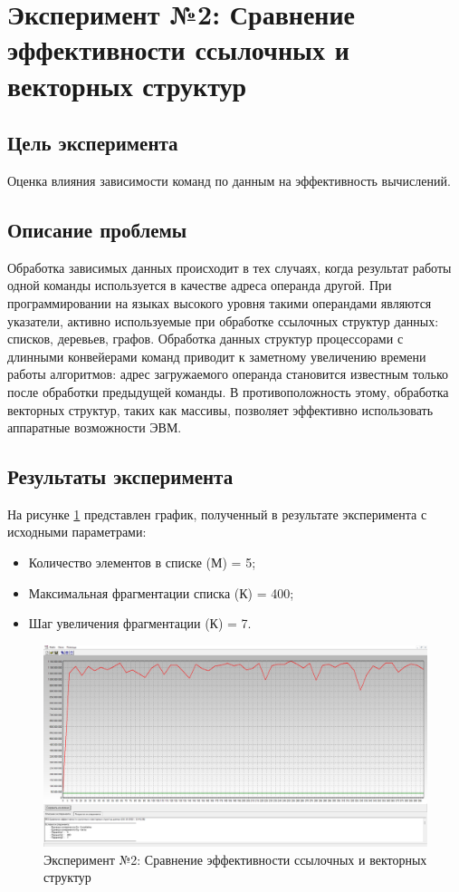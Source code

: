 \newpage


\section*{Эксперимент №2: Сравнение эффективности ссылочных и векторных структур}

\subsection*{Цель эксперимента}
Оценка влияния зависимости команд по данным на эффективность вычислений. 

\subsection*{Описание проблемы}
Обработка зависимых данных происходит в тех случаях, когда результат работы одной команды используется в качестве адреса операнда другой. При программировании на языках высокого уровня такими операндами являются указатели, активно используемые при обработке ссылочных структур данных: списков, деревьев, графов. Обработка данных структур процессорами с длинными конвейерами команд приводит к заметному увеличению времени работы алгоритмов: адрес загружаемого операнда становится известным только после обработки предыдущей команды. В противоположность этому, обработка векторных структур, таких как массивы, позволяет эффективно использовать аппаратные возможности ЭВМ. 

\subsection*{Результаты эксперимента}
На рисунке \ref{ex:t2} представлен график, полученный в результате эксперимента с исходными параметрами:
\begin{itemize}
	\item Количество элементов в списке (М) = 5;
	\item Максимальная фрагментации списка (К) = 400;
	\item Шаг увеличения фрагментации (К) = 7.
\end{itemize}

\begin{figure}[h]
	\centering
	\includegraphics[height=0.35\textheight]{img/t2}
	\caption{Эксперимент №2: Сравнение эффективности ссылочных и векторных структур}
	\label{ex:t2}
\end{figure}

